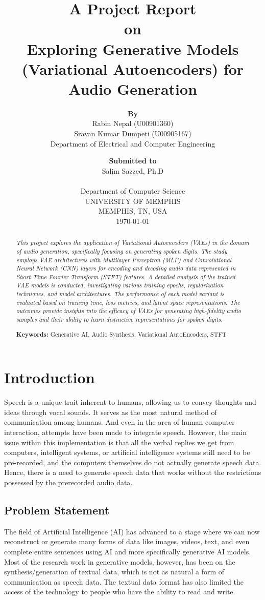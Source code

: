 \documentclass[12pt]{article}
\title{ A Project Report\\ on \\ Exploring Generative Models (Variational Autoencoders) for Audio Generation\\[3.5cm]}
\author{\textbf{By}\\ Rabin Nepal (U00901360)\\ Sravan Kumar Dumpeti (U00905167) \\Department of Electrical and Computer Engineering\\[2cm]}
\date{\textbf{Submitted to} \\ Salim Sazzed, Ph.D \\ [COMP 6741 Intro to Neural Networks] \\ Department of Computer Science \\[2.5cm] UNIVERSITY OF MEMPHIS \\ MEMPHIS, TN, USA \\[2cm] \today\\}
\begin{document}
\begin{titlepage}
    \maketitle
\end{titlepage}


\begin{abstract}
\textit{This project explores the application of Variational Autoencoders (VAEs) in the domain of audio generation, specifically focusing on generating spoken digits. The study employs VAE architectures with Multilayer Perceptron (MLP) and Convolutional Neural Network (CNN) layers for encoding and decoding audio data represented in Short-Time Fourier Transform (STFT) features. A detailed analysis of the trained VAE models is conducted, investigating various training epochs, regularization techniques, and model architectures. The performance of each model variant is evaluated based on training time, loss metrics, and latent space representations. The outcomes provide insights into the efficacy of VAEs for generating high-fidelity audio samples and their ability to learn distinctive representations for spoken digits.
}

\textbf{Keywords:} Generative AI, Audio Synthesis, Variational AutoEncoders, STFT
\end{abstract}

\section{Introduction}
Speech is a unique trait inherent to humans, allowing us to convey thoughts and ideas through vocal sounds. It serves as the most natural method of communication among humans. And even in the area of human-computer interaction, attempts have been made to integrate speech. However, the main issue within this implementation is that all the verbal replies we get from computers, intelligent systems, or artificial intelligence systems still need to be pre-recorded, and the computers themselves do not actually generate speech data. Hence, there is a need to generate speech data that works without the restrictions possessed by the prerecorded audio data.

\subsection{Problem Statement}
The field of Artificial Intelligence (AI) has advanced to a stage where we can now reconstruct or generate many forms of data like images, videos, text, and even complete entire sentences using AI and more specifically generative AI models. Most of the research work in generative models, however, has been on the synthesis/generation of textual data, which is not as natural a form of communication as speech data. The textual data format has also limited the access of the technology to people who have the ability to read and write.
\end{document}
